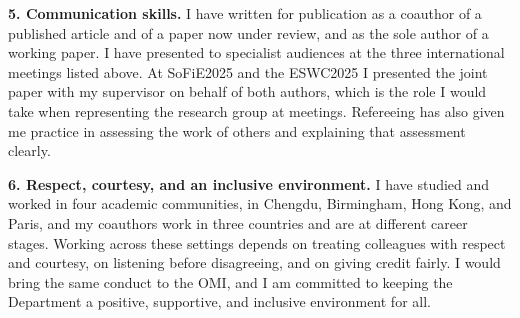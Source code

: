 \documentclass[12pt,a4paper]{article}
\begin{document}
\textbf{5. Communication skills.}
I have written for publication as a coauthor of a published article
and of a paper now under review, and as the sole author of a working paper.
I have presented to specialist audiences at the three international meetings listed above.
At SoFiE2025 and the ESWC2025 I presented the joint paper with my supervisor
on behalf of both authors, which is the role I would take
when representing the research group at meetings.
Refereeing has also given me practice in assessing the work of others
and explaining that assessment clearly.

\textbf{6. Respect, courtesy, and an inclusive environment.}
I have studied and worked in four academic communities,
in Chengdu, Birmingham, Hong Kong, and Paris,
and my coauthors work in three countries and are at different career stages.
Working across these settings depends on treating colleagues with respect and courtesy,
on listening before disagreeing, and on giving credit fairly.
I would bring the same conduct to the OMI, and I am committed to keeping
the Department a positive, supportive, and inclusive environment for all.
\end{document}
